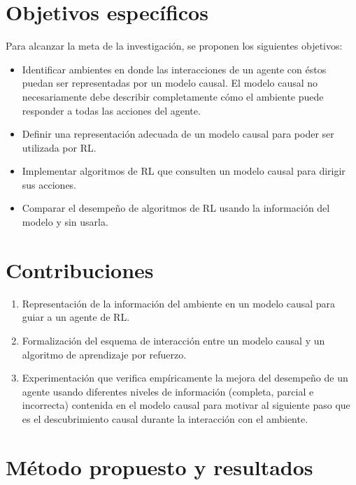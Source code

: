 \section{Objetivos específicos}

Para alcanzar la meta de la investigación, se proponen
los siguientes objetivos:

\begin{itemize}
    \item Identificar ambientes en donde 
    las interacciones de un agente con éstos puedan ser representadas por un modelo causal.
    El modelo causal no necesariamente debe
    describir completamente cómo el ambiente puede responder a todas las acciones del agente.
    \item Definir una representación adecuada
    de un modelo causal para poder ser utilizada 
    por RL.
    \item Implementar algoritmos de RL que consulten un modelo causal para dirigir sus acciones.
    \item Comparar el desempeño de algoritmos
    de RL usando la información del modelo y 
    sin usarla. 
\end{itemize}


\section{Contribuciones}


\begin{enumerate}
    \item Representación de la información del ambiente
    en un modelo causal para guiar a un agente de RL.
    \item 
    Formalización del esquema 
    de interacción entre
    un modelo causal y un algoritmo de aprendizaje por
    refuerzo.
    \item Experimentación que verifica empíricamente
    la mejora del desempeño de un agente usando diferentes niveles de información (completa, parcial e incorrecta) contenida en el modelo causal para motivar al siguiente paso 
    que es el descubrimiento causal durante la interacción con el
    ambiente.
\end{enumerate}

\section{Método propuesto y resultados}

